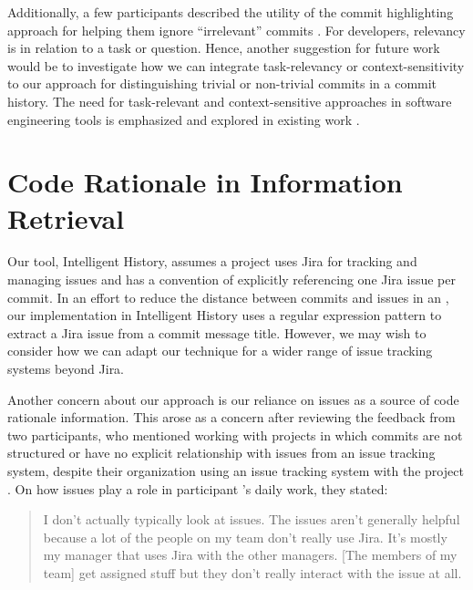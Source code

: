 Additionally, a few participants described the utility of the commit highlighting
approach for helping them ignore ``irrelevant'' commits .
For developers, relevancy is in relation to a task or question.
Hence, another suggestion for future work would be to investigate how
we can integrate task-relevancy or context-sensitivity to our approach for distinguishing trivial or non-trivial
commits in a commit history.
The need for task-relevant and context-sensitive approaches in software engineering tools
is emphasized and explored in existing work 
\cite{cubranic_hipikat_2005,marques_task-relevant_2020,li_what-help_2013}.


\section{Code Rationale in Information Retrieval}

Our tool, Intelligent History, assumes a project uses Jira for tracking and managing issues and has
a convention of explicitly referencing one Jira issue  per commit.
In an effort to reduce the distance between commits and issues in an ,
our implementation in Intelligent History uses a regular expression pattern 
to extract a Jira issue  from a commit message title.
However, we may wish to consider how we can adapt our technique for a wider range of
issue tracking systems beyond Jira.

Another concern about our approach is our reliance on issues
as a source of code rationale information.
This arose as a concern after reviewing the feedback from two participants, 
who mentioned working with projects in which commits are not structured or 
have no explicit relationship with issues
from an issue tracking system, despite their organization using an issue tracking system with the project .
On how issues play a role in participant 's daily work, they stated:

\begin{quote}
    I don’t actually typically look at issues. 
    The issues aren’t generally helpful because a lot of the people on my team don’t really use Jira. 
    It’s mostly my manager that uses Jira with the other managers. 
    [The members of my team] get assigned stuff but they don’t really interact with the issue at all.
\end{quote}


